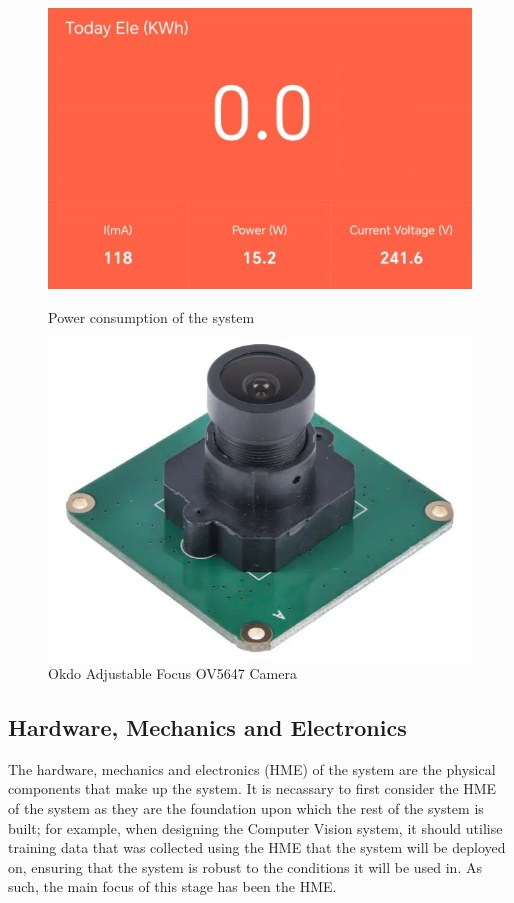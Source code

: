 \begin{figure}
\begin{minipage}[t]{0.22\textwidth}
      \includegraphics[width=\textwidth]{imgs/powermeter.png}
      \caption{Power consumption of the system}
  \end{minipage}
  \hfill
  \begin{minipage}[t]{0.22\textwidth}
    \centering
    \includegraphics[width=\textwidth]{imgs/okdo_camera.jpg}
    \caption{Okdo Adjustable Focus OV5647 Camera\cite{okdocamera}}
  \end{minipage}
\end{figure}

\subsection{Hardware, Mechanics and Electronics}
The hardware, mechanics and electronics (HME) of the system are the physical components that make up the system.
It is necassary to first consider the HME of the system as they are the foundation upon which the rest of the system is built;
for example, when designing the Computer Vision system, it should utilise training data that was collected using the HME 
that the system will be deployed on, ensuring that the system is robust to the conditions it will be used in. As such,
the main focus of this stage has been the HME.
